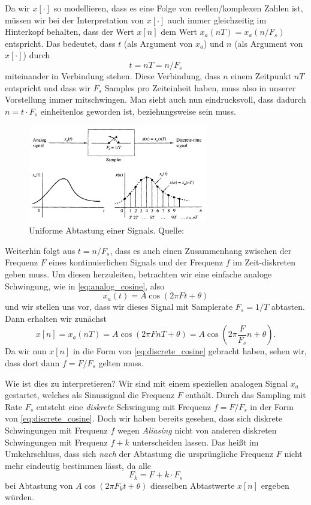 Da wir $x[\cdot]$ so modellieren, dass es  eine Folge von reellen/komplexen Zahlen ist, müssen wir bei der Interpretation von $x[\cdot]$ auch immer gleichzeitig im Hinterkopf behalten, dass der Wert $x[n]$ dem Wert $x_a(n T) = x_a(n/F_s)$ entspricht.
Das bedeutet, dass $t$ (als Argument von $x_a$) und $n$ (als Argument von $x[\cdot]$) durch
\[
t = n T = n/F_s
\]
miteinander in Verbindung stehen. 
Diese Verbindung, dass $n$ einem Zeitpunkt $nT$ entspricht und dass wir $F_s$  Samples pro Zeiteinheit haben, muss also in unserer Vorstellung immer mitschwingen.
Man sieht auch nun eindrucksvoll, dass dadurch $n = t \cdot F_s$ einheitenlos geworden ist, beziehungsweise sein muss.
%
\begin{figure}
    \begin{center}
        \includegraphics[width=0.7\textwidth]{img/sampling/uniform_sampling.png}
    \end{center}
    \caption{Uniforme Abtastung einer Signals. Quelle: \cite{proakis2013}}\label{fig:uniform_sampling}
\end{figure}

Weiterhin folgt aus $t = n/F_s$, dass es auch einen Zusammenhang zwischen der Frequenz $F$ eines kontinuierlichen Signals und der Frequenz $f$ im Zeit-diskreten geben muss.
Um diesen herzuleiten, betrachten wir eine einfache analoge Schwingung, wie in \eqref{eq:analog_cosine}, also
\[
x_a(t) = A \cos(2 \pi F t + \theta)
\]
und wir stellen uns vor, dass wir dieses Signal mit Samplerate $F_s = 1/T$ abtasten. Dann erhalten wir zunächst
\[
x[n] 
    = x_a(n T) 
    = A \cos(2 \pi F n T + \theta) 
    = A \cos\left(2 \pi \frac{F}{F_s} n + \theta\right).
\]
Da wir nun $x[n]$ in die Form von \eqref{eq:discrete_cosine} gebracht haben, sehen wir, dass dort dann $f = F/F_s$ gelten muss.

Wie ist dies zu interpretieren? 
Wir sind mit einem speziellen analogen Signal $x_a$ gestartet, welches als Sinussignal die Frequenz $F$ enthält.
Durch das Sampling mit Rate $F_s$ entsteht eine \emph{diskrete} Schwingung mit Frequenz $f = F/F_s$ in der Form von \eqref{eq:discrete_cosine}. 
Doch wir haben bereits gesehen, dass sich diskrete Schwingungen mit Frequenz $f$ wegen \emph{Aliasing} nicht von anderen diskreten Schwingungen mit Frequenz $f + k$ unterscheiden lassen.
Das heißt im Umkehrschluss, dass sich \emph{nach} der Abtastung die ursprüngliche Frequenz $F$ nicht mehr eindeutig bestimmen lässt, da alle
\[
F_k = F + k \cdot F_s 
\]
bei Abtastung von $A \cos(2 \pi F_k t + \theta)$ diesselben Abtastwerte $x[n]$ ergeben würden.

